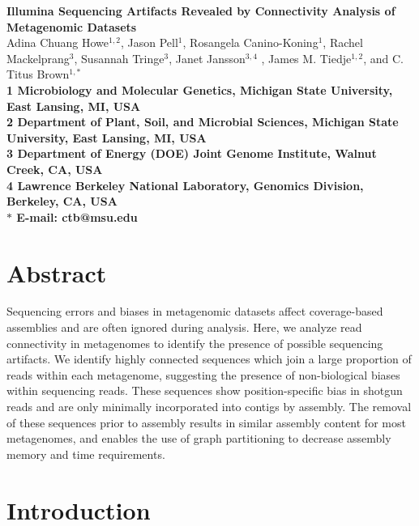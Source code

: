 \documentclass[10pt]{article}
\date{}
\begin{document}
\begin{flushleft}
{\Large \textbf{Illumina Sequencing Artifacts Revealed by Connectivity
    Analysis of Metagenomic Datasets} }
\\
Adina Chuang Howe$^{1,2}$, 
Jason Pell$^{1}$,
Rosangela Canino-Koning$^{1}$,
Rachel Mackelprang$^{3}$,
Susannah Tringe$^{3}$,
Janet Jansson$^{3,4}$ ,
James M. Tiedje$^{1,2}$, and 
C. Titus Brown$^{1,\ast}$
\\
\bf{1} Microbiology and Molecular Genetics, Michigan State University, East Lansing, MI, USA
\\
\bf{2} Department of Plant, Soil, and Microbial Sciences, Michigan State University, East Lansing, MI, USA
\\
\bf{3} Department of Energy (DOE) Joint Genome Institute, Walnut Creek, CA, USA
\\
\bf{4} Lawrence Berkeley National Laboratory, Genomics Division, Berkeley, CA, USA
\\
$\ast$ E-mail: ctb@msu.edu
\end{flushleft}

\section*{Abstract}

Sequencing errors and biases in metagenomic datasets affect
coverage-based assemblies and are often ignored during analysis.
Here, we analyze read connectivity in metagenomes to identify the
presence of possible sequencing artifacts.  We identify highly
connected sequences which join a large proportion of reads within each
metagenome, suggesting the presence of non-biological biases within
sequencing reads.  These sequences show position-specific bias in
shotgun reads and are only minimally incorporated into contigs by
assembly.  The removal of these sequences prior to assembly results in
similar assembly content for most metagenomes, and enables the use of
graph partitioning to decrease assembly memory and time requirements.

\section*{Introduction}
\end{document}
